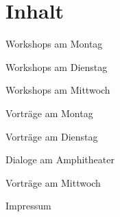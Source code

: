 \section*{Inhalt}

\vspace*{0.35em}%
\noindent Workshops am Montag \dotfill \pageref{montag-workshops}

\vspace*{0.35em}%
\noindent Workshops am Dienstag \dotfill \pageref{dienstag-workshops}

\vspace*{0.35em}%
\noindent Workshops am Mittwoch \dotfill \pageref{mittwoch-workshops}

\vspace*{0.35em}%
\noindent Vorträge am Montag \dotfill \pageref{montag}

\vspace*{0.35em}%
\noindent Vorträge am Dienstag \dotfill \pageref{dienstag}

\vspace*{0.35em}%
\noindent Dialoge am Amphitheater \dotfill \pageref{social-event}

\vspace*{0.35em}%
\noindent Vorträge am Mittwoch \dotfill \pageref{mittwoch}

\vspace*{0.35em}%
\noindent Impressum \dotfill \pageref{impressum}

\label{omniscale}\vspace{1\baselineskip}
\enlargethispage{1\baselineskip}
\noindent